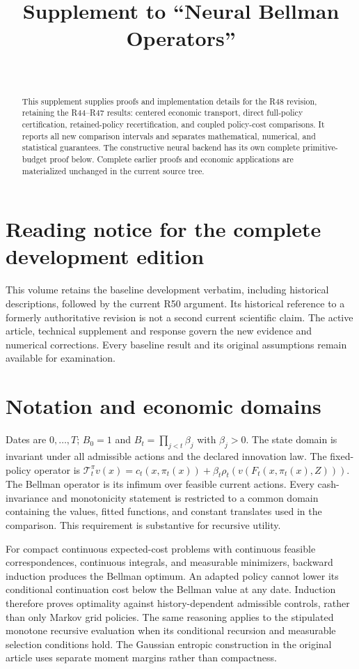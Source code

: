 \documentclass[ecta,nameyear,draft]{econsocart}
\begin{document}
\begin{frontmatter}
\title{Supplement to ``Neural Bellman Operators''}
\begin{aug}
\author[id=au1,addressref={add1}]{~}
\address[id=add1]{Peking University}
\end{aug}
\begin{abstract}
This supplement supplies proofs and implementation details for the R48 revision, retaining the R44--R47 results: centered economic transport, direct full-policy certification, retained-policy recertification, and coupled policy-cost comparisons. It reports all new comparison intervals and separates mathematical, numerical, and statistical guarantees. The constructive neural backend has its own complete primitive-budget proof below. Complete earlier proofs and economic applications are materialized unchanged in the current source tree.
\end{abstract}
\end{frontmatter}
\section*{Reading notice for the complete development edition}
This volume retains the baseline development verbatim, including historical descriptions, followed by the current R50 argument. Its historical reference to a formerly authoritative revision is not a second current scientific claim. The active article, technical supplement and response govern the new evidence and numerical corrections. Every baseline result and its original assumptions remain available for examination.

\section{Notation and economic domains}
Dates are $0,\ldots,T$; $B_0=1$ and $B_t=\prod_{j<t}\beta_j$ with $\beta_j>0$. The state domain is invariant under all admissible actions and the declared innovation law. The fixed-policy operator is
$\mathcal T_t^\pi v(x)=c_t(x,\pi_t(x))+\beta_t\rho_t(v(F_t(x,\pi_t(x),Z)))$.
The Bellman operator is its infimum over feasible current actions. Every cash-invariance and monotonicity statement is restricted to a common domain containing the values, fitted functions, and constant translates used in the comparison. This requirement is substantive for recursive utility.

For compact continuous expected-cost problems with continuous feasible correspondences, continuous integrals, and measurable minimizers, backward induction produces the Bellman optimum. An adapted policy cannot lower its conditional continuation cost below the Bellman value at any date. Induction therefore proves optimality against history-dependent admissible controls, rather than only Markov grid policies. The same reasoning applies to the stipulated monotone recursive evaluation when its conditional recursion and measurable selection conditions hold. The Gaussian entropic construction in the original article uses separate moment margins rather than compactness.
\end{document}
